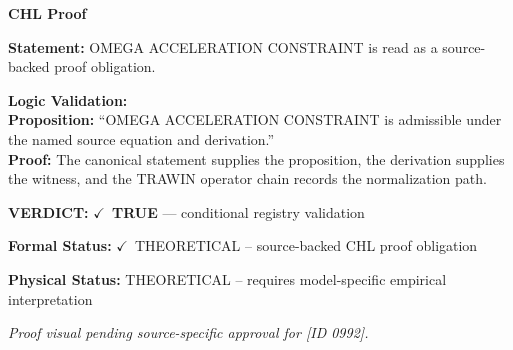 \vspace{0.45em}
\noindent\textbf{CHL Proof}\par
\textbf{Statement:} OMEGA ACCELERATION CONSTRAINT is read as a source-backed proof obligation.

\textbf{Logic Validation:}\\
\textbf{Proposition:} ``OMEGA ACCELERATION CONSTRAINT is admissible under the named source equation and derivation.''\\
\textbf{Proof:} The canonical statement supplies the proposition, the derivation supplies the witness, and the TRAWIN operator chain records the normalization path.

\textbf{VERDICT:} \ensuremath{\checkmark}\ \textbf{TRUE} --- conditional registry validation

\textbf{Formal Status:} \ensuremath{\checkmark}\ THEORETICAL -- source-backed CHL proof obligation

\textbf{Physical Status:} THEORETICAL -- requires model-specific empirical interpretation
\par\vspace{0.45em}
\par
\vfill
\begingroup\footnotesize\itshape
Proof visual pending source-specific approval for [ID 0992].
\par\endgroup
\vfill
\endgroup
\endgroup
